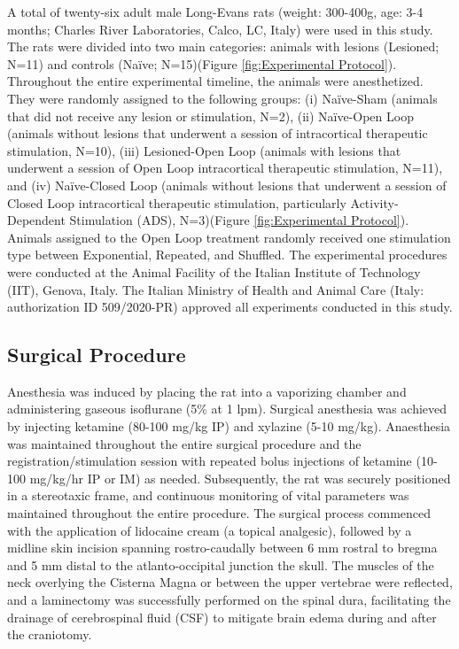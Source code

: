 A total of twenty-six adult male Long-Evans rats (weight: 300-400g, age: 3-4 months; Charles River Laboratories, Calco, LC, Italy) were used in this study. The rats were divided into two main categories: animals with lesions (Lesioned; N=11) and controls (Naïve; N=15)(Figure \ref{fig:Experimental Protocol}). Throughout the entire experimental timeline, the animals were anesthetized. They were randomly assigned to the following groups: (i) Naïve-Sham (animals that did not receive any lesion or stimulation, N=2), (ii) Naïve-Open Loop (animals without lesions that underwent a session of intracortical therapeutic stimulation, N=10), (iii) Lesioned-Open Loop (animals with lesions that underwent a session of Open Loop intracortical therapeutic stimulation, N=11), and (iv) Naïve-Closed Loop (animals without lesions that underwent a session of Closed Loop intracortical therapeutic stimulation, particularly Activity-Dependent Stimulation (ADS), N=3)(Figure \ref{fig:Experimental Protocol}). Animals assigned to the Open Loop treatment randomly received one stimulation type between Exponential, Repeated, and Shuffled. The experimental procedures were conducted at the Animal Facility of the Italian Institute of Technology (IIT), Genova, Italy. The Italian Ministry of Health and Animal Care (Italy: authorization ID 509/2020-PR) approved all experiments conducted in this study.

\subsection{Surgical Procedure}

Anesthesia was induced by placing the rat into a vaporizing chamber and administering gaseous isoflurane (5\% at 1 lpm). Surgical anesthesia was achieved by injecting ketamine (80-100 mg/kg IP) and xylazine (5-10 mg/kg). Anaesthesia was maintained throughout the entire surgical procedure and the registration/stimulation session with repeated bolus injections of ketamine (10-100 mg/kg/hr IP or IM) as needed. Subsequently, the rat was securely positioned in a stereotaxic frame, and continuous monitoring of vital parameters was maintained throughout the entire procedure. The surgical process commenced with the application of lidocaine cream (a topical analgesic), followed by a midline skin incision spanning rostro-caudally between 6 mm rostral to bregma and 5 mm distal to the atlanto-occipital junction the skull. The muscles of the neck overlying the Cisterna Magna or between the upper vertebrae were reflected, and a laminectomy was successfully performed on the spinal dura, facilitating the drainage of cerebrospinal fluid (CSF) to mitigate brain edema during and after the craniotomy.

